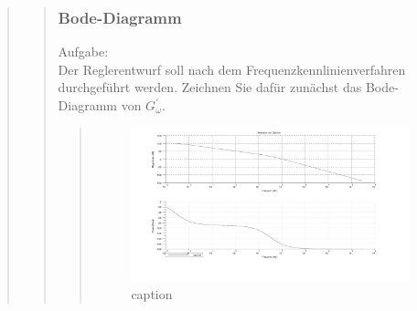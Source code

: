 \begin{quote}
\begin{quote}
		\subsubsection{Bode-Diagramm}
        Aufgabe:\\
        Der Reglerentwurf soll nach dem Frequenzkennlinienverfahren durchgeführt werden. Zeichnen Sie dafür zunächst
        das Bode-Diagramm von $G_\omega^{'}$.\\   
        \begin{quote}
            \begin{figure}[H]
            \centering
                \includegraphics[scale=0.5, trim = 0cm 0cm 0cm 0cm, clip]{./Bilder/BodevonGstrich}
                    \caption{caption}
                    \label{fig:BodevonGstrich}
            \end{figure}
       
        \end{quote}


\end{quote}
\end{quote}
